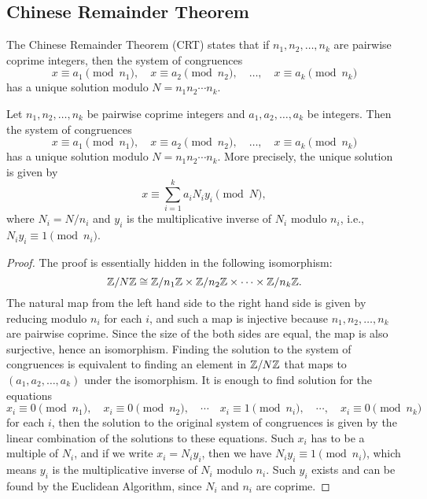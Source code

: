 \subsection{Chinese Remainder Theorem}
\label{subsec:basicnt_crt}

The Chinese Remainder Theorem (CRT) states that if $n_1, n_2, \ldots, n_k$ are pairwise coprime integers, then the system of congruences
\[
    x \equiv a_1 \pmod{n_1}, \quad x \equiv a_2 \pmod{n_2}, \quad \ldots, \quad x \equiv a_k \pmod{n_k}
\]
has a unique solution modulo $N = n_1 n_2 \cdots n_k$.
\begin{theorem}
    \label{thm:crt}
    Let $n_1, n_2, \ldots, n_k$ be pairwise coprime integers and $a_1, a_2, \ldots, a_k$ be integers.
    Then the system of congruences
    \[
        x \equiv a_1 \pmod{n_1}, \quad x \equiv a_2 \pmod{n_2}, \quad \ldots, \quad x \equiv a_k \pmod{n_k}
    \]
    has a unique solution modulo $N = n_1 n_2 \cdots n_k$.
    More precisely, the unique solution is given by
    \[
        x \equiv \sum_{i=1}^k a_i N_i y_i \pmod{N},
    \]
    where $N_i = N / n_i$ and $y_i$ is the multiplicative inverse of $N_i$ modulo $n_i$, i.e., $N_i y_i \equiv 1 \pmod{n_i}$.
\end{theorem}

\begin{proof}
    The proof is essentially hidden in the following isomorphism:
    \[
        \mathbb{Z} / N\mathbb{Z} \cong \mathbb{Z} / n_1\mathbb{Z} \times \mathbb{Z} / n_2\mathbb{Z} \times \cdots \times \mathbb{Z} / n_k\mathbb{Z}.
    \]
    The natural map from the left hand side to the right hand side is given by reducing modulo $n_i$ for each $i$, and such a map is injective because $n_1, n_2, \ldots, n_k$ are pairwise coprime.
    Since the size of the both sides are equal, the map is also surjective, hence an isomorphism.
    Finding the solution to the system of congruences is equivalent to finding an element in $\mathbb{Z} / N\mathbb{Z}$ that maps to $(a_1, a_2, \ldots, a_k)$ under the isomorphism.
    It is enough to find solution for the equations
    \[
        x_i \equiv 0 \pmod{n_1}, \quad x_i \equiv 0 \pmod{n_2}, \quad \cdots \quad x_i \equiv 1 \pmod{n_i}, \quad \cdots, \quad x_i \equiv 0 \pmod{n_k}
    \]
    for each $i$, then the solution to the original system of congruences is given by the linear combination of the solutions to these equations.
    Such $x_i$ has to be a multiple of $N_i$, and if we write $x_i = N_i y_i$, then we have $N_i y_i \equiv 1 \pmod{n_i}$, which means $y_i$ is the multiplicative inverse of $N_i$ modulo $n_i$.
    Such $y_i$ exists and can be found by the Euclidean Algorithm, since $N_i$ and $n_i$ are coprime.
\end{proof}

